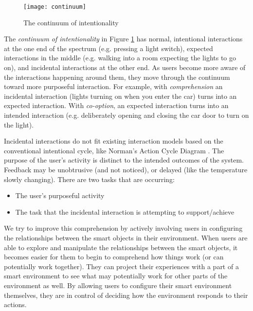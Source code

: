 \begin{figure}
	\centering
	\centerline{\texttt{[image: continuum]}}
	\caption{The continuum of intentionality}
	\label{continuum}
\end{figure}	

	The \emph{continuum of intentionality} in Figure \ref{continuum} has normal, intentional interactions at the one end of the spectrum (e.g. pressing a light switch), expected interactions in the middle (e.g. walking into a room expecting the lights to go on), and incidental interactions at the other end. As users become more aware of the interactions happening around them, they move through the continuum toward more purposeful interaction. For example, with \emph{comprehension} an incidental interaction (lights turning on when you enter the car) turns into an expected interaction. With \emph{co-option}, an expected interaction turns into an intended interaction (e.g. deliberately opening and closing the car door to turn on the light).

	Incidental interactions do not fit existing interaction models based on the conventional intentional cycle, like Norman's Action Cycle Diagram \cite{Norman1998}. The purpose of the user's activity is distinct to the intended outcomes of the system. Feedback may be unobtrusive (and not noticed), or delayed (like the temperature slowly changing). There are two tasks that are occurring:

	\begin{itemize}
	\item The user's purposeful activity
	\item The task that the incidental interaction is attempting to support/achieve
	\end{itemize}

We try to improve this comprehension by actively involving users in configuring the relationships between the smart objects in their environment. When users are able to explore and manipulate the relationships between the smart objects, it becomes easier for them to begin to comprehend how things work (or can potentially work together). They can project their experiences with a part of a smart environment to see what may potentially work for other parts of the environment as well. %
By allowing users to configure their smart environment themselves, they are in control of deciding how the environment responds to their actions.

